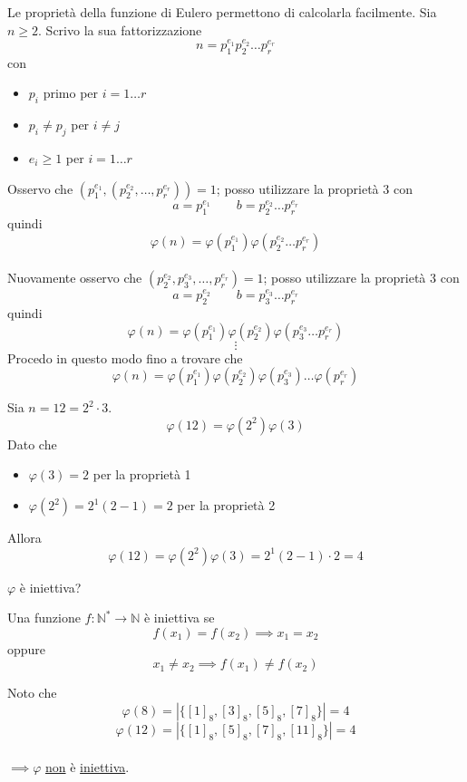 \documentclass[a4paper,12pt, oneside]{book}
\begin{document}
Le proprietà della funzione di Eulero permettono di calcolarla facilmente.
Sia $n \geq 2$. Scrivo la sua fattorizzazione $$n = p_1^{e_1} p_2^{e_2} \dots p_r^{e_r}$$ con \begin{itemize}
	\item $p_i$ primo per $i=1\dots r$
	\item $p_i \not = p_j$ per $i \not = j$
	\item $e_i \geq 1$ per $i = 1 \dots r$
\end{itemize}
Osservo che $(p_1^{e_1}, (p_2^{e_2}, \dots, p_r^{e_r})) = 1$; posso utilizzare la proprietà 3 con
$$a=p_1^{e_1} \qquad b=p_2^{e_2} \dots p_r^{e_r}$$ quindi
$$\varphi(n) = \varphi(p_1^{e_1})\varphi(p_2^{e_2} \dots p_r^{e_r})$$\\
Nuovamente osservo che $(p_2^{e_2}, p_3^{e_3}, \dots, p_r^{e_r}) = 1$; posso utilizzare la proprietà 3 con
$$a=p_2^{e_2} \qquad b=p_3^{e_3} \dots p_r^{e_r}$$ quindi
$$\varphi(n) = \varphi(p_1^{e_1})\varphi(p_2^{e_2})\varphi(p_3^{e_3} \dots p_r^{e_r})$$
$$\vdots$$
Procedo in questo modo fino a trovare che $$\varphi(n) = \varphi(p_1^{e_1})\varphi(p_2^{e_2})\varphi(p_3^{e_3}) \dots \varphi(p_r^{e_r})$$

\begin{esempio}
	Sia $n=12 = 2^2 \cdot 3$.\\
	$$\varphi(12) = \varphi(2^2)\varphi(3)$$
	Dato che \begin{itemize}
		\item $\varphi(3)=2$ per la proprietà 1
		\item $\varphi(2^2)=2^1(2-1) = 2$ per la proprietà 2
	\end{itemize}
	Allora $$\varphi(12) = \varphi(2^2)\varphi(3)=2^1(2-1) \cdot 2 = 4$$
\end{esempio}

\begin{osservazione}
	$\varphi$ è iniettiva?
	\begin{shaded}
		\begin{definizione}
			Una funzione $f: \mathbb{N}^* \rightarrow \mathbb{N}$ è iniettiva se
			$$f(x_1)=f(x_2) \implies x_1=x_2$$
			oppure
			$$x_1 \not = x_2 \implies f(x_1) \not = f(x_2)$$
		\end{definizione}
	\end{shaded}
	Noto che
	$$\varphi(8) = |\{ [1]_8, [3]_8, [5]_8, [7]_8 \}| = 4$$
	$$\varphi(12) = |\{ [1]_8, [5]_8, [7]_8, [11]_8 \}| = 4$$\\
	$\implies \varphi$ \underline{non} è \underline{iniettiva}.
\end{osservazione}
\end{document}
